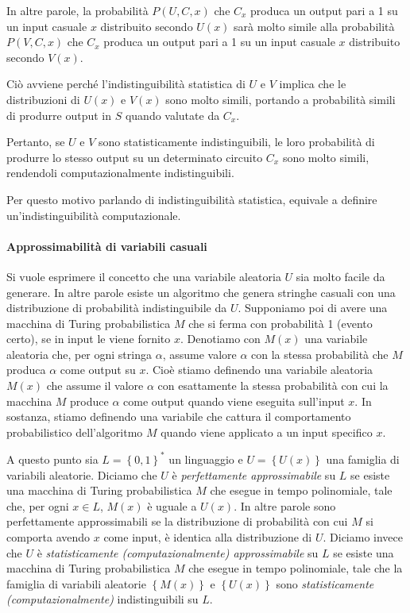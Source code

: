 \documentclass{article}
\theoremstyle{definition}
\begin{document}
In altre parole, la probabilità $P(U, C, x)$ che $C_x$ produca un output pari a 1 su un input casuale $x$ distribuito secondo $U(x)$ sarà molto simile alla probabilità $P(V, C, x)$ che $C_x$ produca un output pari a 1 su un input casuale $x$ distribuito secondo $V(x)$.

Ciò avviene perché l'indistinguibilità statistica di $U$ e $V$ implica che le distribuzioni di $U(x)$ e $V(x)$ sono molto simili, portando a probabilità simili di produrre output in $S$ quando valutate da $C_x$.

Pertanto, se $U$ e $V$ sono statisticamente indistinguibili, le loro probabilità di produrre lo stesso output su un determinato circuito $C_x$ sono molto simili, rendendoli computazionalmente indistinguibili.

Per questo motivo parlando di indistinguibilità statistica, equivale a definire un'indistinguibilità computazionale.

\paragraph{Approssimabilità di variabili casuali}
Si vuole esprimere il concetto che una variabile aleatoria $U$ sia molto facile da generare. In altre parole esiste un algoritmo che genera stringhe casuali con una distribuzione di probabilità indistinguibile da $U$. Supponiamo poi di avere una macchina di Turing probabilistica $M$ che si ferma con probabilità 1 (evento certo), se in input le viene fornito $x$. 
Denotiamo con $M(x)$ una variabile aleatoria che, per ogni stringa $\alpha$, assume valore $\alpha$ con la stessa probabilità che $M$ produca $\alpha$ come output su $x$.
Cioè stiamo definendo una variabile aleatoria $M(x)$ che assume il valore $\alpha$ con esattamente la stessa probabilità con cui la macchina $M$ produce $\alpha$ come output quando viene eseguita sull'input $x$.
In sostanza, stiamo definendo una variabile che cattura il comportamento probabilistico dell'algoritmo $M$ quando viene applicato a un input specifico $x$.

A questo punto sia $L = \left\{0,1\right\}^*$ un linguaggio e $U = \left\{U(x)\right\}$ una famiglia di variabili aleatorie. Diciamo che $U$ è \emph{perfettamente approssimabile} su $L$ se esiste una macchina di Turing probabilistica $M$ che esegue in tempo polinomiale, tale che, per ogni $x \in L$, $M(x)$ è uguale a $U(x)$. In altre parole sono perfettamente approssimabili se la distribuzione di probabilità con cui $M$ si comporta avendo $x$ come input, è identica alla distribuzione di $U$. Diciamo invece che $U$ è \emph{statisticamente (computazionalmente) approssimabile} su $L$ se esiste una macchina di Turing probabilistica $M$ che esegue in tempo polinomiale, tale che la famiglia di variabili aleatorie $\left\{ M(x) \right\}$ e $\left\{ U(x) \right\}$ sono \emph{statisticamente (computazionalmente)} indistinguibili su $L$.
\end{document}
